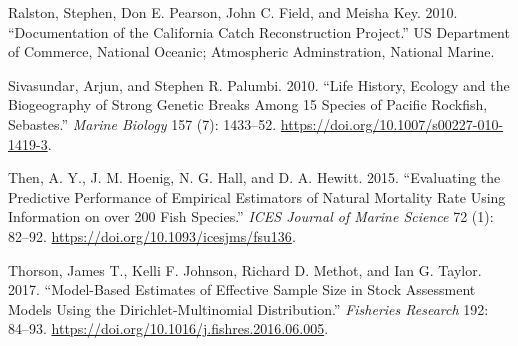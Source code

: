 \documentclass[11pt,
  english,
  a4paper,
]{article}
\begin{document}
\begin{cslreferences}
\leavevmode\hypertarget{ref-ralston_documentation_2010}{}%
Ralston, Stephen, Don E. Pearson, John C. Field, and Meisha Key. 2010. ``Documentation of the California Catch Reconstruction Project.'' US Department of Commerce, National Oceanic; Atmospheric Adminstration, National Marine.

\leavevmode\hypertarget{ref-sivasundar_life_2010}{}%
Sivasundar, Arjun, and Stephen R. Palumbi. 2010. ``Life History, Ecology and the Biogeography of Strong Genetic Breaks Among 15 Species of Pacific Rockfish, Sebastes.'' \emph{Marine Biology} 157 (7): 1433--52. \url{https://doi.org/10.1007/s00227-010-1419-3}.

\leavevmode\hypertarget{ref-then_evaluating_2015-1}{}%
Then, A. Y., J. M. Hoenig, N. G. Hall, and D. A. Hewitt. 2015. ``Evaluating the Predictive Performance of Empirical Estimators of Natural Mortality Rate Using Information on over 200 Fish Species.'' \emph{ICES Journal of Marine Science} 72 (1): 82--92. \url{https://doi.org/10.1093/icesjms/fsu136}.

\leavevmode\hypertarget{ref-thorson_model-based_2017}{}%
Thorson, James T., Kelli F. Johnson, Richard D. Methot, and Ian G. Taylor. 2017. ``Model-Based Estimates of Effective Sample Size in Stock Assessment Models Using the Dirichlet-Multinomial Distribution.'' \emph{Fisheries Research} 192: 84--93. \url{https://doi.org/10.1016/j.fishres.2016.06.005}.
\end{cslreferences}
\end{document}
